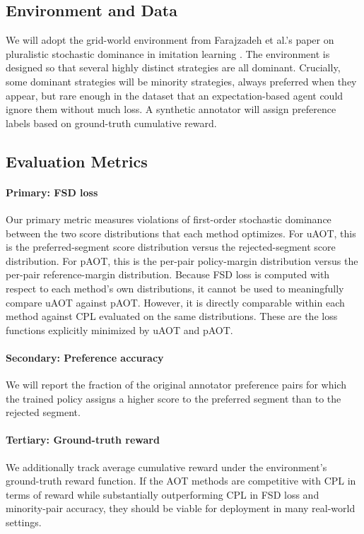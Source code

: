 \documentclass[11pt]{article}
\begin{document}
\subsection{Environment and Data}

We will adopt the grid-world environment from Farajzadeh et al.'s paper on pluralistic stochastic dominance in imitation learning \cite{farajzadeh2025psd}. The environment is designed so that several highly distinct strategies are all dominant. Crucially, some dominant strategies will be minority strategies, always preferred when they appear, but rare enough in the dataset that an expectation-based agent could ignore them without much loss. A synthetic annotator will assign preference labels based on ground-truth cumulative reward.

\subsection{Evaluation Metrics}


\paragraph{Primary: FSD loss} Our primary metric measures violations of first-order stochastic dominance between the two score distributions that each method optimizes. For uAOT, this is the preferred-segment score distribution versus the rejected-segment score distribution. For pAOT, this is the per-pair policy-margin distribution versus the per-pair reference-margin distribution. Because FSD loss is computed with respect to each method’s own distributions, it cannot be used to meaningfully compare uAOT against pAOT. However, it is directly comparable within each method against CPL evaluated on the same distributions. These are the loss functions explicitly minimized by uAOT and pAOT.

\paragraph{Secondary: Preference accuracy} We will report the fraction of the original annotator preference pairs for which the trained policy assigns a higher score to the preferred segment than to the rejected segment.

\paragraph{Tertiary: Ground-truth reward} We additionally track average cumulative reward under the environment’s ground-truth reward function. If the AOT methods are competitive with CPL in terms of reward while substantially outperforming CPL in FSD loss and minority-pair accuracy, they should be viable for deployment in many real-world settings.
\end{document}
